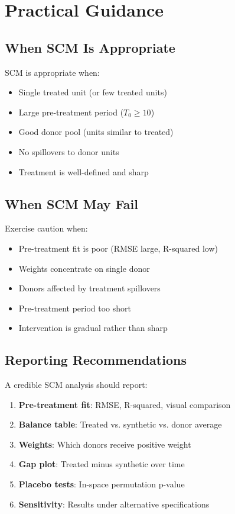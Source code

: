 \section{Practical Guidance}
\label{sec:scm_practical}

\subsection{When SCM Is Appropriate}

SCM is appropriate when:
\begin{itemize}
    \item Single treated unit (or few treated units)
    \item Large pre-treatment period ($T_0 \geq 10$)
    \item Good donor pool (units similar to treated)
    \item No spillovers to donor units
    \item Treatment is well-defined and sharp
\end{itemize}

\subsection{When SCM May Fail}

Exercise caution when:
\begin{itemize}
    \item Pre-treatment fit is poor (RMSE large, R-squared low)
    \item Weights concentrate on single donor
    \item Donors affected by treatment spillovers
    \item Pre-treatment period too short
    \item Intervention is gradual rather than sharp
\end{itemize}

\subsection{Reporting Recommendations}

A credible SCM analysis should report:
\begin{enumerate}
    \item \textbf{Pre-treatment fit}: RMSE, R-squared, visual comparison
    \item \textbf{Balance table}: Treated vs. synthetic vs. donor average
    \item \textbf{Weights}: Which donors receive positive weight
    \item \textbf{Gap plot}: Treated minus synthetic over time
    \item \textbf{Placebo tests}: In-space permutation p-value
    \item \textbf{Sensitivity}: Results under alternative specifications
\end{enumerate}

